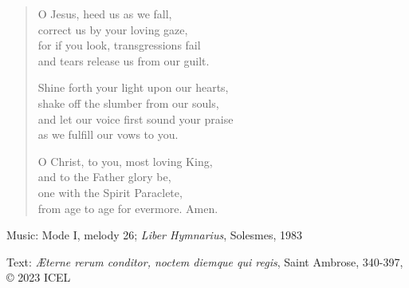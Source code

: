 \hymn



\setlength{\leftmargini}{2em}
\begin{verse}




O Jesus, heed us as we fall,\\
correct us by your loving gaze,\\
for if you look, transgressions fail\\
and tears release us from our guilt.

Shine forth your light upon our hearts,\\
shake off the slumber from our souls,\\
and let our voice first sound your praise\\
as we fulfill our vows to you.

O Christ, to you, most loving King,\\
and to the Father glory be,\\
one with the Spirit Paraclete,\\
from age to age for evermore. Amen.
\end{verse}
\setlength{\leftmargini}{\defleftmargini}

\begin{hymnsource}
Music: Mode I, melody 26; \emph{Liber Hymnarius}, Solesmes, 1983

Text: \emph{Æterne rerum conditor, noctem diemque qui regis}, Saint Ambrose, 340-397, © 2023 ICEL
\end{hymnsource}
